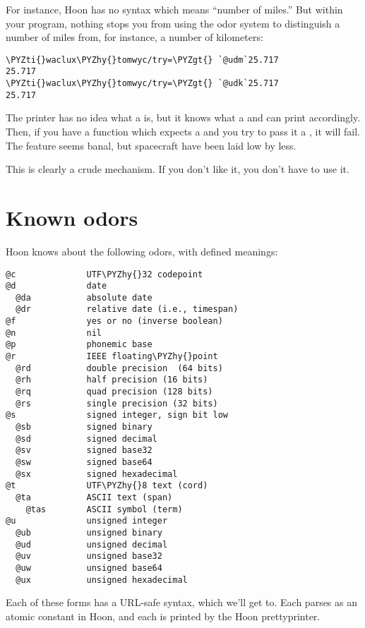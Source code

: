 For instance, Hoon has no syntax which means ``number of miles.''
But within your program, nothing stops you from using the odor
system to distinguish a number of miles from, for instance, a
number of kilometers:

\begin{framed_shaded}
\begin{Verbatim}[fontsize=\relsize{-2.5},fontseries=b,commandchars=\\\{\}]
\PYZti{}waclux\PYZhy{}tomwyc/try=\PYZgt{} `@udm`25.717
25.717
\PYZti{}waclux\PYZhy{}tomwyc/try=\PYZgt{} `@udk`25.717
25.717
\end{Verbatim}
\end{framed_shaded}
The printer has no idea what a  is, but it knows what a
 and can print accordingly.  Then, if you have a function
which expects a  and you try to pass it a , it will
fail.  The feature seems banal, but spacecraft have been laid low
by less.

This is clearly a crude mechanism.  If you don't like it, you
don't have to use it.

\section{Known odors}

Hoon knows about the following odors, with defined meanings:

\begin{framed_shaded}
\begin{Verbatim}[fontsize=\relsize{-2.5},fontseries=b,commandchars=\\\{\}]
@c              UTF\PYZhy{}32 codepoint
@d              date
  @da           absolute date
  @dr           relative date (i.e., timespan)
@f              yes or no (inverse boolean)
@n              nil
@p              phonemic base
@r              IEEE floating\PYZhy{}point
  @rd           double precision  (64 bits)
  @rh           half precision (16 bits)
  @rq           quad precision (128 bits)
  @rs           single precision (32 bits)
@s              signed integer, sign bit low
  @sb           signed binary
  @sd           signed decimal
  @sv           signed base32
  @sw           signed base64
  @sx           signed hexadecimal
@t              UTF\PYZhy{}8 text (cord)
  @ta           ASCII text (span)
    @tas        ASCII symbol (term)
@u              unsigned integer
  @ub           unsigned binary
  @ud           unsigned decimal
  @uv           unsigned base32
  @uw           unsigned base64
  @ux           unsigned hexadecimal
\end{Verbatim}
\end{framed_shaded}
Each of these forms has a URL-safe syntax, which we'll get to.
Each parses as an atomic constant in Hoon, and each is printed
by the Hoon prettyprinter.

